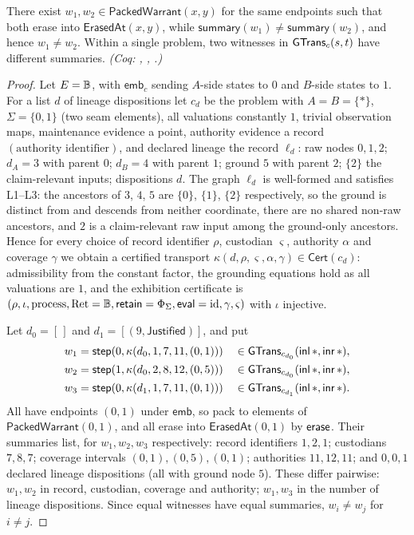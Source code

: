 \begin{thm}\label{thm:multiplicity}
There exist $w_1, w_2 \in \mathsf{PackedWarrant}(x,y)$ for the same endpoints such that both erase into $\mathsf{ErasedAt}(x,y)$, while $\mathsf{summary}(w_1) \neq \mathsf{summary}(w_2)$, and hence $w_1 \neq w_2$. Within a single problem, two witnesses in $\mathsf{GTrans}_c(s,t)$ have different summaries. \emph{(Coq: , , .)}
\end{thm}
\begin{proof}
Let $E = \mathbb{B}$, with $\mathsf{emb}_c$ sending $A$-side states to $0$ and $B$-side states to $1$. For a list $d$ of lineage dispositions let $c_d$ be the problem with $A = B = \{\ast\}$, $\Sigma = \{0,1\}$ (two seam elements), all valuations constantly $1$, trivial observation maps, maintenance evidence a point, authority evidence a record $(\text{authority identifier})$, and declared lineage the record $\ell_d$: raw nodes $0,1,2$; $d_A = 3$ with parent $0$; $d_B = 4$ with parent $1$; ground $5$ with parent $2$; $\{2\}$ the claim-relevant inputs; dispositions $d$. The graph $\ell_d$ is well-formed and satisfies L1--L3: the ancestors of $3$, $4$, $5$ are $\{0\}$, $\{1\}$, $\{2\}$ respectively, so the ground is distinct from and descends from neither coordinate, there are no shared non-raw ancestors, and $2$ is a claim-relevant raw input among the ground-only ancestors. Hence for every choice of record identifier $\rho$, custodian $\varsigma$, authority $\alpha$ and coverage $\gamma$ we obtain a certified transport $\kappa(d,\rho,\varsigma,\alpha,\gamma) \in \mathsf{Cert}(c_d)$: admissibility from the constant factor, the grounding equations hold as all valuations are $1$, and the exhibition certificate is $(\rho, \iota, \text{process}, \mathrm{Ret} = \mathbb{B}, \mathsf{retain} = \Phi_\Sigma, \mathsf{eval} = \mathrm{id}, \gamma, \varsigma)$ with $\iota$ injective.

Let $d_0 = [\,]$ and $d_1 = [(9,\mathsf{Justified})]$, and put
\begin{align*}
w_1 &= \mathsf{step}(0, \kappa(d_0, 1, 7, 11, (0,1))) && \in \mathsf{GTrans}_{c_{d_0}}(\mathsf{inl}\,\ast, \mathsf{inr}\,\ast),\\
w_2 &= \mathsf{step}(1, \kappa(d_0, 2, 8, 12, (0,5))) && \in \mathsf{GTrans}_{c_{d_0}}(\mathsf{inl}\,\ast, \mathsf{inr}\,\ast),\\
w_3 &= \mathsf{step}(0, \kappa(d_1, 1, 7, 11, (0,1))) && \in \mathsf{GTrans}_{c_{d_1}}(\mathsf{inl}\,\ast, \mathsf{inr}\,\ast).
\end{align*}
All have endpoints $(0,1)$ under $\mathsf{emb}$, so pack to elements of $\mathsf{PackedWarrant}(0,1)$, and all erase into $\mathsf{ErasedAt}(0,1)$ by $\mathsf{erase}$. Their summaries list, for $w_1,w_2,w_3$ respectively: record identifiers $1,2,1$; custodians $7,8,7$; coverage intervals $(0,1),(0,5),(0,1)$; authorities $11,12,11$; and $0,0,1$ declared lineage dispositions (all with ground node $5$). These differ pairwise: $w_1,w_2$ in record, custodian, coverage and authority; $w_1,w_3$ in the number of lineage dispositions. Since equal witnesses have equal summaries, $w_i \neq w_j$ for $i \neq j$.
\end{proof}
